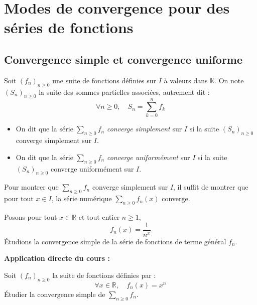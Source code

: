 \documentclass[french,11pt,twoside]{VcCours}
\newenvironment{ApplicationDirecte}{\textbf{Application directe du cours :}

}{}
\begin{document}
\section{Modes de convergence pour des séries de fonctions}
\subsection{Convergence simple et convergence uniforme}
\begin{Definition}{} Soit $(f_n)_{n \geq 0}$ une suite de fonctions définies sur $I$ à valeurs dans $\mathbb{K}$. On note $(S_n)_{n \geq 0}$ la suite des sommes partielles associées, autrement dit :
$$ \forall n \geq 0, \quad S_n = \sum_{k=0}^n f_k $$

\begin{itemize}
\item On dit que la série $\sum_{n \geq 0} f_n$ \emph{converge simplement} sur $I$ si la suite $(S_n)_{n \geq 0}$ converge simplement sur $I$.
\item On dit que la série $\sum_{n \geq 0} f_n$ \emph{converge uniformément} sur $I$ si la suite $(S_n)_{n \geq 0}$ converge uniformément sur $I$.
\end{itemize}
\end{Definition}

\begin{Methode}{} Pour montrer que $\sum_{n \geq 0} f_n$ converge simplement sur $I$, il suffit de montrer que pour tout $x \in I$, la série numérique $\sum_{n \geq 0} f_n(x)$ converge.
\end{Methode}

\begin{Exemple} Posons pour tout $x \in \mathbb{R}$ et tout entier $n \geq 1$,
$$ f_n(x) = \frac{1}{n^x}$$
Étudions la convergence simple de la série de fonctions de terme général $f_n$.

\vspace*{5cm}

%
\end{Exemple}

\begin{ApplicationDirecte} Soit $(f_n)_{n \geq 0}$ la suite de fonctions définies par :
$$ \forall x \in \mathbb{R}, \quad f_n(x) = x^n$$
Étudier la convergence simple de $\sum_{n \geq 0} f_n$.
\end{ApplicationDirecte}
\end{document}
